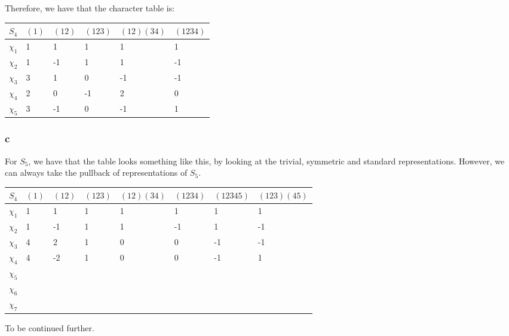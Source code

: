 \documentclass[]{article}
\begin{document}
Therefore, we have that the character table is:
\begin{table}[h!]
	\centering
	\begin{tabular}{|l|l|l|l|l|l|}
		\hline
		$S_4$    & $(1)$ & $(12)$ & $(123)$ & $(12)(34)$ & $(1234)$ \\ \hline
		$\chi_1$ & 1     & 1      & 1       & 1          & 1        \\ \hline
		$\chi_2$ & 1     & -1     & 1       & 1          & -1       \\ \hline
		$\chi_3$ & 3     & 1      & 0       & -1         & -1       \\ \hline
		$\chi_4$ & 2     & 0      & -1      & 2          & 0        \\ \hline
		$\chi_5$ & 3     & -1     & 0       & -1         & 1        \\ \hline
	\end{tabular}
\end{table}

\subsubsection*{c}
For $S_5$, we have that the table looks something like this, by looking at the trivial, symmetric and standard representations. However, we can always take the pullback of representations of $S_5$. 
\begin{table}[h!]
	\centering
	\begin{tabular}{|l|l|l|l|l|l|l|l|}
		\hline
		$S_4$    & $(1)$ & $(12)$ & $(123)$ & $(12)(34)$ & $(1234)$ & $(12345)$ & $(123)(45)$ \\ \hline
		$\chi_1$ & 1     & 1      & 1       & 1          & 1        & 1         & 1           \\ \hline
		$\chi_2$ & 1     & -1     & 1       & 1          & -1       & 1         & -1          \\ \hline
		$\chi_3$ & 4     & 2      & 1       & 0          & 0        & -1        & -1          \\ \hline
		$\chi_4$ & 4     & -2     & 1       & 0          & 0        & -1        & 1           \\ \hline
		$\chi_5$ &       &        &         &            &          &           &             \\ \hline
		$\chi_6$ &       &        &         &            &          &           &             \\ \hline
		$\chi_7$ &       &        &         &            &          &           &             \\ \hline
	\end{tabular}
\end{table}
To be continued further.
\end{document}
